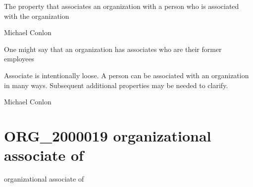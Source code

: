 \documentclass[letterpaper,10pt,english]{sphinxmanual}
\begin{document}
\begin{sphinxShadowBox}

\sphinxAtStartPar
The property that associates an organization with a person who is associated with the organization
\end{sphinxShadowBox}

\begin{sphinxShadowBox}

\sphinxAtStartPar
Michael Conlon 
\end{sphinxShadowBox}

\begin{sphinxShadowBox}

\sphinxAtStartPar
One might say that an organization has associates who are their former employees
\end{sphinxShadowBox}

\begin{sphinxShadowBox}

\sphinxAtStartPar
Associate is intentionally loose.  A person can be associated with an organization in many ways.  Subsequent additional properties may be needed to clarify.
\end{sphinxShadowBox}

\begin{sphinxShadowBox}

\sphinxAtStartPar
Michael Conlon 
\end{sphinxShadowBox}
\begin{quote}
\label{\detokenize{doc-ORG_2000019:org-2000019}}\label{\detokenize{doc-ORG_2000019:organizational-associate-of}}\label{\detokenize{doc-ORG_2000019:org-2000019}}
\ignorespaces \end{quote}


\section{ORG\_2000019 \sphinxhyphen{} organizational associate of}
\label{\detokenize{doc-ORG_2000019:org-2000019-organizational-associate-of}}\label{\detokenize{doc-ORG_2000019:index-0}}\label{\detokenize{doc-ORG_2000019::doc}}
\begin{sphinxShadowBox}

\sphinxAtStartPar
organizational associate of
\end{sphinxShadowBox}
\end{document}

